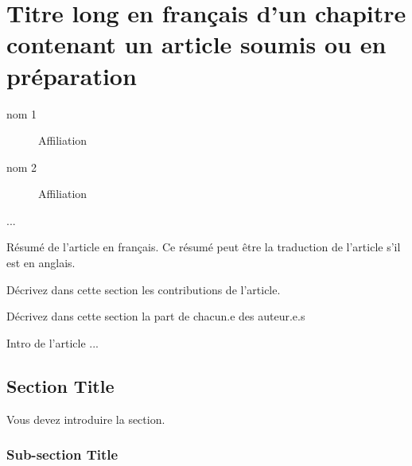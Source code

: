 \chapter[Article soumis ou en préparation]
{Titre long en français d'un chapitre contenant un article soumis ou en préparation}
\label{chap:soumis}

\begin{authorsArticle} %
	\begin{description}
		\item[\large nom 1] Affiliation
		\item[\large nom 2] Affiliation
		\item[\large ...] 
	\end{description}
\end{authorsArticle}

\begin{abstractArticle}
	Résumé de l'article en français. Ce résumé peut être la traduction de l'article s'il est en anglais.
\end{abstractArticle}

\begin{contributions}
	Décrivez dans cette section les contributions de l'article.
\end{contributions}

\begin{commentairesArticle}
	Décrivez dans cette section la part de chacun.e des auteur.e.s
\end{commentairesArticle}

\modeAnglais



Intro de l'article ...

\section{Section Title }

Vous devez introduire la section.

\subsection{Sub-section Title}


